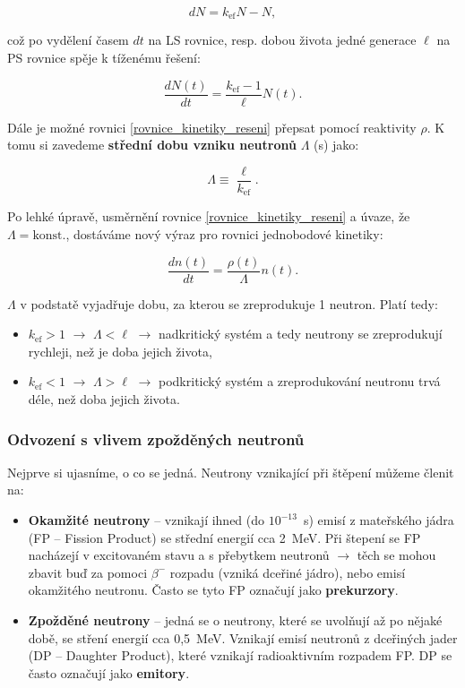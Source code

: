 $$ dN = k_{\text{ef}}N - N, $$

což po vydělení časem $dt$ na LS rovnice, resp. dobou života jedné generace $\ell$ na PS rovnice spěje k tíženému řešení:

$$ \dfrac{dN(t)}{dt} = \dfrac{k_{\text{ef}} - 1}{\ell} N(t). $$

Dále je možné rovnici \eqref{rovnice_kinetiky_reseni} přepsat pomocí reaktivity $\rho$. K tomu si zavedeme \textbf{střední dobu vzniku neutronů} $\Lambda$ (s) jako:

\begin{equation}
  \boxed{
  \Lambda \equiv \dfrac{\ell}{k_{\text{ef}}}.
  \label{stredni_doba_vzniku}}
\end{equation}

Po lehké úpravě, usměrnění rovnice \eqref{rovnice_kinetiky_reseni} a úvaze, že $\Lambda = \text{konst.}$, dostáváme nový výraz pro rovnici jednobodové kinetiky:

\begin{equation}
  \boxed{
  \dfrac{dn(t)}{dt} = \dfrac{\rho (t)}{\Lambda} n(t).
  \label{rovnice_kinetiky_reaktivita}}
\end{equation}

$\Lambda$ v podstatě vyjadřuje dobu, za kterou se zreprodukuje 1 neutron. Platí tedy:

\begin{itemize}
  \item $k_{\text{ef}} > 1$ $\rightarrow$ $\Lambda < \ell$ $\rightarrow$ nadkritický systém a tedy neutrony se zreprodukují rychleji, než je doba jejich života,
  \item $k_{\text{ef}} < 1$ $\rightarrow$ $\Lambda > \ell$ $\rightarrow$ podkritický systém a zreprodukování neutronu trvá déle, než doba jejich života.
\end{itemize}

\subsubsection{Odvození s vlivem zpožděných neutronů}

Nejprve si ujasníme, o co se jedná. Neutrony vznikající při štěpení můžeme členit na:

\begin{itemize}
  \item \textbf{Okamžité neutrony} -- vznikají ihned (do $10^{-13}$~s) emisí z mateřského jádra (FP -- Fission Product) se střední energií cca 2~MeV. Při štepení se FP nacházejí v excitovaném stavu a s přebytkem neutronů $\rightarrow$ těch se mohou zbavit buď za pomoci $\beta^-$ rozpadu (vzniká dceřiné jádro), nebo emisí okamžitého neutronu. Často se tyto FP označují jako \textbf{prekurzory}.
  \item \textbf{Zpožděné neutrony} -- jedná se o neutrony, které se uvolňují až po nějaké době, se stření energií cca 0,5~MeV. Vznikají emisí neutronů z dceřiných jader (DP -- Daughter Product), které vznikají radioaktivním rozpadem FP. DP se často označují jako \textbf{emitory}.
\end{itemize}

